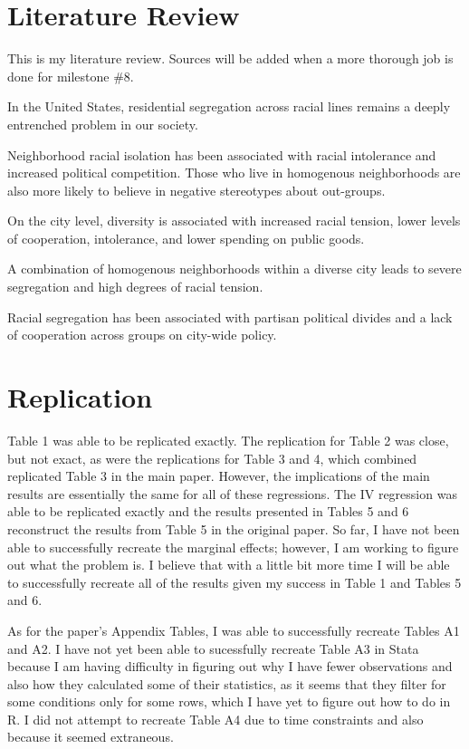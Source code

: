 \documentclass[]{article}
\begin{document}
\hypertarget{literature-review}{%
\section{Literature Review}\label{literature-review}}

This is my literature review. Sources will be added when a more thorough
job is done for milestone \#8.

In the United States, residential segregation across racial lines
remains a deeply entrenched problem in our society.

Neighborhood racial isolation has been associated with racial
intolerance and increased political competition. Those who live in
homogenous neighborhoods are also more likely to believe in negative
stereotypes about out-groups.

On the city level, diversity is associated with increased racial
tension, lower levels of cooperation, intolerance, and lower spending on
public goods.

A combination of homogenous neighborhoods within a diverse city leads to
severe segregation and high degrees of racial tension.

Racial segregation has been associated with partisan political divides
and a lack of cooperation across groups on city-wide policy.

\hypertarget{replication}{%
\section{Replication}\label{replication}}

Table 1 was able to be replicated exactly. The replication for Table 2
was close, but not exact, as were the replications for Table 3 and 4,
which combined replicated Table 3 in the main paper. However, the
implications of the main results are essentially the same for all of
these regressions. The IV regression was able to be replicated exactly
and the results presented in Tables 5 and 6 reconstruct the results from
Table 5 in the original paper. So far, I have not been able to
successfully recreate the marginal effects; however, I am working to
figure out what the problem is. I believe that with a little bit more
time I will be able to successfully recreate all of the results given my
success in Table 1 and Tables 5 and 6.

As for the paper's Appendix Tables, I was able to successfully recreate
Tables A1 and A2. I have not yet been able to sucessfully recreate Table
A3 in Stata because I am having difficulty in figuring out why I have
fewer observations and also how they calculated some of their
statistics, as it seems that they filter for some conditions only for
some rows, which I have yet to figure out how to do in R. I did not
attempt to recreate Table A4 due to time constraints and also because it
seemed extraneous.
\end{document}
